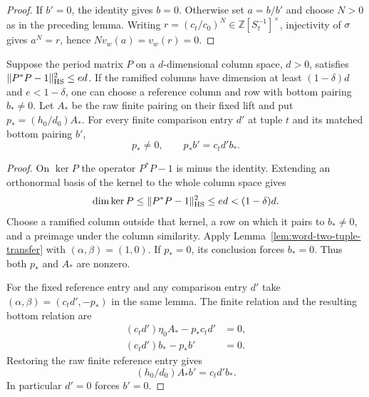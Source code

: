\begin{proof}
If \(b'=0\), the identity gives \(b=0\). Otherwise set \(a=b/b'\)
and choose \(N>0\) as in the preceding lemma. Writing
\(r=(c_t/c_0)^N\in\mathbb Z[S_t^{-1}]^\times\),
injectivity of \(\sigma\) gives \(a^N=r\), hence
\(N v_w(a)=v_w(r)=0\).
\end{proof}

\begin{lemma}\label{lem:nonzero-word-reference-entry}
Suppose the period matrix \(P\) on a \(d\)-dimensional column space,
\(d>0\), satisfies \(\|P^*P-1\|_{\rm HS}^2\le ed\).
If the ramified columns have dimension at least \((1-\delta)d\)
and \(e<1-\delta\), one can choose a reference column and row
with bottom pairing \(b_*\ne0\). Let \(A_*\) be the raw finite
pairing on their fixed lift and put \(p_*=(h_0/d_0)A_*\).
For every finite comparison entry \(d'\) at tuple \(t\) and its
matched bottom pairing \(b'\),
\[
    p_*\ne0,\qquad p_*b'=c_t d' b_* .
\]
\end{lemma}
\begin{proof}
On \(\ker P\) the operator \(P^*P-1\) is minus the identity. Extending
an orthonormal basis of the kernel to the whole column space gives
\[
 \dim\ker P\le\|P^*P-1\|_{\rm HS}^2\le ed<(1-\delta)d.
\]
Choose a ramified column outside that kernel, a row on which it
pairs to \(b_*\ne0\), and a preimage under the column similarity.
Apply Lemma~\ref{lem:word-two-tuple-transfer} with
\((\alpha,\beta)=(1,0)\). If \(p_*=0\), its conclusion forces
\(b_*=0\). Thus both \(p_*\) and \(A_*\) are nonzero.

For the fixed reference entry and any comparison entry \(d'\) take
\((\alpha,\beta)=(c_t d',-p_*)\) in the same lemma. The finite
relation and the resulting bottom relation are
\[
 \begin{aligned}
  (c_t d')\eta_0 A_*-p_*c_t d'&=0,\\
  (c_t d')b_*-p_*b'&=0 .
 \end{aligned}
\]
Restoring the raw finite reference entry gives
\begin{equation}\label{eq:raw-word-reference}
       (h_0/d_0)A_* b'=c_t d' b_* .
\end{equation}
In particular \(d'=0\)
forces \(b'=0\).
\end{proof}

